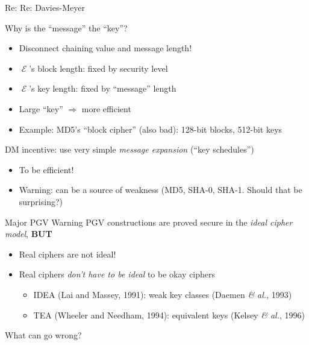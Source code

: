 \documentclass[xcolor=table,usenames,dvipsnames,compress]{beamer}
\newcommand\etal{\emph{\& al.}\xspace}
\DeclareMathOperator\E{\mathcal{E}}
\begin{document}
\begin{frame}{Re: Re: Davies-Meyer}
\vspace{-4mm}

Why is the ``message'' the ``key''?
\begin{itemize}
\item Disconnect chaining value and message length!
\item $\E$'s block length: fixed by security level
\item $\E$'s key length: fixed by ``message'' length
\item Large ``key'' $\Rightarrow$ more efficient
\item Example: MD5's ``block cipher'' (also bad): 128-bit blocks, 512-bit keys
\end{itemize}

\medskip

DM incentive: use very simple \emph{message expansion} (``key schedules'')
\begin{itemize}
\item To be efficient!
\item Warning: can be a source of weakness (MD5, SHA-0, SHA-1. Should that be surprising?)
\end{itemize}
\end{frame}

\begin{frame}{Major PGV Warning}
PGV constructions are proved secure in the \emph{ideal cipher model}, \textbf{BUT}
\begin{itemize}
\item Real ciphers are not ideal!
\item Real ciphers \emph{don't have to be ideal} to be okay ciphers
\begin{itemize}
\item IDEA (Lai and Massey, 1991): weak key classes (Daemen \etal, 1993)
\item TEA (Wheeler and Needham, 1994): equivalent keys (Kelsey \etal, 1996)
\end{itemize}
\end{itemize}

\medskip

What can go wrong?
\end{frame}
\end{document}

